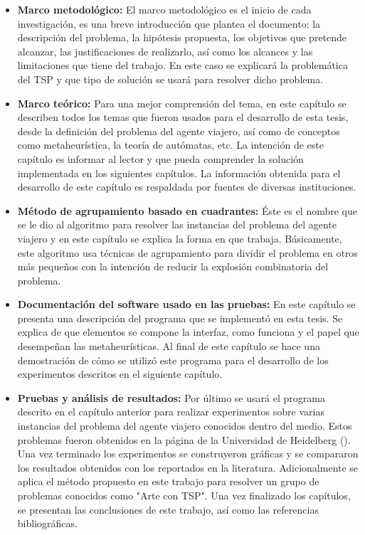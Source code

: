 \begin{itemize}
\item \textbf{Marco metodológico: }El marco metodológico es el inicio de cada investigación, es una breve introducción que plantea el documento: la descripción del problema, la hipótesis propuesta, los objetivos que pretende alcanzar, las justificaciones de realizarlo, así como los alcances y las limitaciones que tiene del trabajo. En este caso se explicará la problemática del TSP y que tipo de solución se usará para resolver dicho problema.
\item \textbf{Marco teórico: }Para una mejor comprensión del tema, en este capítulo se describen todos los temas que fueron usados para el desarrollo de esta tesis, desde la definición del problema del agente viajero, así como de conceptos como metaheurística, la teoría de autómatas, etc. La intención de este capítulo es informar al lector y que pueda comprender la solución implementada en los siguientes capítulos. La información obtenida para el desarrollo de este capítulo es respaldada por fuentes de diversas instituciones.
\item \textbf{Método de agrupamiento basado en cuadrantes: }Éste es el nombre que se le dio al algoritmo para resolver las instancias del problema del agente viajero y en este capítulo se explica la forma en que trabaja. Básicamente, este algoritmo usa técnicas de agrupamiento para dividir el problema en otros más pequeños con la intención de reducir la explosión combinatoria del problema.
\item \textbf{Documentación del software usado en las pruebas: }En este capítulo se presenta una descripción del programa que se implementó en esta tesis. Se explica de que elementos se compone la interfaz, como funciona y el papel que desempeñan las metaheurísticas. Al final de este capítulo se hace una demostración de cómo se utilizó este programa para el desarrollo de los experimentos descritos en el siguiente capítulo.
\item \textbf{Pruebas y análisis de resultados: }Por último se usará el programa descrito en el capítulo anterior para realizar experimentos sobre varias instancias del problema del agente viajero conocidos dentro del medio. Estos problemas fueron obtenidos en la página de la Universidad de Heidelberg (\cite{[TSPLIB]}). Una vez terminado los experimentos se construyeron gráficas y se compararon los resultados obtenidos con los reportados en la literatura. Adicionalmente se aplica el método propuesto en este trabajo para resolver un grupo de problemas conocidos como "Arte con TSP". Una vez finalizado los capítulos, se presentan las conclusiones de este trabajo, así como las referencias bibliográficas. 
\end{itemize}
\newpage
